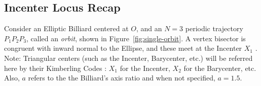 \subsection{Incenter Locus Recap}

Consider an Elliptic Billiard \cite{sergei91} centered at $O$, and an $N=3$ periodic trajectory $P_1P_2P_3$, called an {\em orbit}, shown in Figure~\ref{fig:single-orbit}. A vertex bisector is congruent with inward normal to the Ellipse, and these meet at the Incenter $X_1$ \cite{etc}.\\

\noindent Note: Triangular centers (such as the Incenter, Barycenter, etc.) will be referred here by their Kimberling Codes \cite{etc}: $X_1$ for the Incenter, $X_2$ for the Barycenter, etc. Also, $a$ refers to the the Billiard's axis ratio and when not specified, $a=1.5$.

